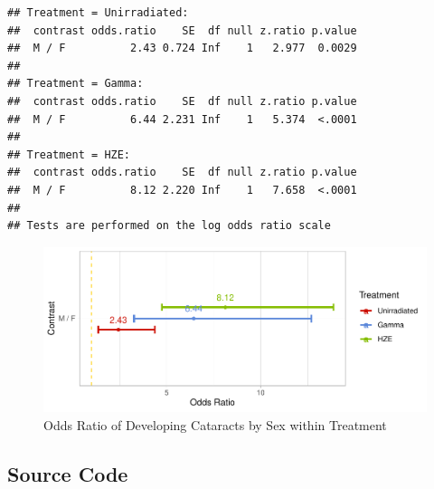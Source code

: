 \documentclass[12pt]{article}
\begin{document}
\begin{verbatim}
## Treatment = Unirradiated:
##  contrast odds.ratio    SE  df null z.ratio p.value
##  M / F          2.43 0.724 Inf    1   2.977  0.0029
## 
## Treatment = Gamma:
##  contrast odds.ratio    SE  df null z.ratio p.value
##  M / F          6.44 2.231 Inf    1   5.374  <.0001
## 
## Treatment = HZE:
##  contrast odds.ratio    SE  df null z.ratio p.value
##  M / F          8.12 2.220 Inf    1   7.658  <.0001
## 
## Tests are performed on the log odds ratio scale
\end{verbatim}

\begin{figure}[H]

{\centering \includegraphics{bookdown_report_files/figure-latex/oddsr2-1} 

}

\caption{Odds Ratio of Developing 
Cataracts by Sex within Treatment}\label{fig:oddsr2}
\end{figure}

\hypertarget{source-code}{%
\subsection{Source Code}\label{source-code}}
\end{document}
